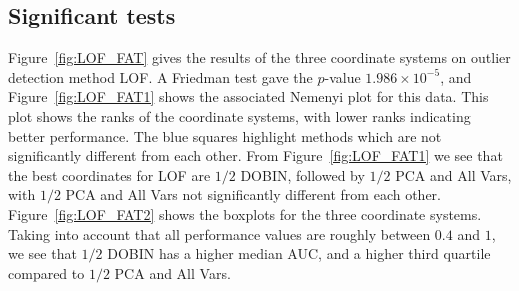 \documentclass[a4paper,11pt]{article}
\begin{document}
\subsection{Significant tests}\label{sec:DatRepo1}


Figure~\ref{fig:LOF_FAT} gives the results of the three coordinate systems on outlier detection method LOF. A Friedman test gave the $p$-value $1.986 \times 10^{-5}$, and Figure~\ref{fig:LOF_FAT1} shows the associated Nemenyi plot for this data. This plot shows the ranks of the coordinate systems, with lower ranks indicating better performance. The blue squares highlight methods which are not significantly different from each other. From Figure~\ref{fig:LOF_FAT1} we see that the best coordinates for LOF are $1/2$ DOBIN, followed by $1/2$ PCA and All Vars, with $1/2$ PCA and All Vars not significantly different from each other.
Figure~\ref{fig:LOF_FAT2} shows the boxplots for the three coordinate systems. Taking into account that all performance values are roughly between $0.4$ and $1$,  we see that $1/2$ DOBIN has a higher median AUC, and a higher third quartile compared to $1/2$ PCA and All Vars. 
\end{document}
